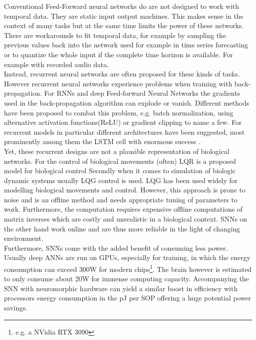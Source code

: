 Conventional Feed-Forward neural networks do are not designed to work with temporal data. They are static input output machines. This makes sense in the context of many tasks but at the same time limits the power of these networks. There are workarounds to fit temporal data, for example by sampling the previous values back into the network used for example in time series forecasting \cite{tang_feedforward_1993}\cite{yang_cascade_2022}\cite{uncini_audio_2003} or to quantize the whole input if the complete time horizon is available. For example with recorded audio data.\\
Instead, recurrent neural networks are often proposed for these kinds of tasks. However recurrent neural networks experience problems when training with back-propagation\cite{bengio_learning_1994}. For \acp{RNN} and deep Feed-forward Neural Networks the gradients used in the back-propagation algorithm can explode or vanish. Different methods have been proposed to combat this problem, e.g. batch normalization\cite{ioffe_batch_2015}, using alternative activation functions(ReLU)\cite{nair_rectified_2010} or gradient clipping\cite{pascanu_difficulty_2013} to name a few. For recurrent models in particular different architectures have been suggested, most prominently among them the LSTM cell \cite{hochreiter_long_1997} with enormous success \cite{mayer_system_2006, sak_long_2014, li_constructing_2015}.\\
Yet, these recurrent designs are not a plausible representation of biological networks.
For the control of biological movements (often) \ac{LQR} is a proposed model for biological control \cite{li_iterative_2004}
Secondly when it comes to simulation of biologic dynamic systems usually \ac{LQG} control is used. LQG has been used widely for modelling biological movements and control. However, this approach is prone to noise and is an offline method and needs appropriate tuning of parameters to work. Furthermore, the computation requires expensive offline computations of matrix inverses which are costly and unrealistic in a biological context.
\acp{SNN} on the other hand work online and are thus more reliable in the light of changing environment.\\

Furthermore, \acp{SNN} come with the added benefit of consuming less power. Usually deep \acp{ANN} are run on \acp{GPU}, especially for training, in which the energy consumption can exceed 300W for modern chips\footnote{e.g. a NVidia RTX 3090}. The brain however is estimated to only consume about
20W \cite{clarke_circulation_1999} for immense computing capacity. Accompanying the \ac{SNN} with neuromorphic hardware can yield a similar boost in efficiency with processors energy consumption in the pJ per \ac{SOP}\cite{indiveri_importance_2019} offering a huge potential power savings.




